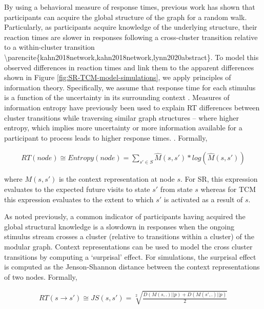 \ac{By using a behavioral measure of response times, previous work has shown that participants can acquire the global structure of the graph for a random walk. Particularly, as participants acquire knowledge of the underlying structure, their reaction times are slower in responses following a cross-cluster transition relative to a within-cluster transition \parencite{kahn2018network,kahn2018network,lynn2020abstract}.} To model this observed differences in reaction times and link them to the apparent differences shown in Figure \ref{fig:SR-TCM-model-simulations}, we apply principles of information theory. Specifically, we assume that response time for each stimulus is a function of the uncertainty in its surrounding context \parencite{fitts1964information}. Measures of information entropy have previously been used to explain RT differences between cluster transitions while traversing similar graph structures -- \ac{where higher entropy, which implies more uncertainty or more information available for a participant to process leads to higher response times.} \cite{lynn2020abstract, lynn2020human,lynn2020humans}. Formally, 

\begin{equation}
	\begin{aligned}
		RT(node) \cong Entropy(node) = \sum_{s' \in S} \hat{M}(s, s') * log(\hat{M}(s, s'))
	\end{aligned}
\end{equation}

where $M(s, s')$ is the context representation at node $s$. For SR, this expression evaluates to the expected future visits to state $s'$ from state $s$ whereas for TCM this expression evaluates to the extent to which $s'$ is activated as a result of $s$. 

As noted previously, a common indicator of participants having acquired the global structural knowledge is a slowdown in responses when the ongoing stimulus stream crosses a cluster (relative to transitions within a cluster) of the modular graph. Context representations can be used to model the cross cluster transitions by computing a `surprisal' effect. For simulations, the surprisal effect is computed as the Jenson-Shannon distance between the context representations of two nodes. Formally, 

\begin{equation}
	\begin{aligned}
		RT(s \rightarrow s') \cong JS(s, s') = \sqrt[2]{\frac{D(M(s, .) || p) + D(M(s', .) || p)}{2}} \\
	\end{aligned}
\end{equation}


